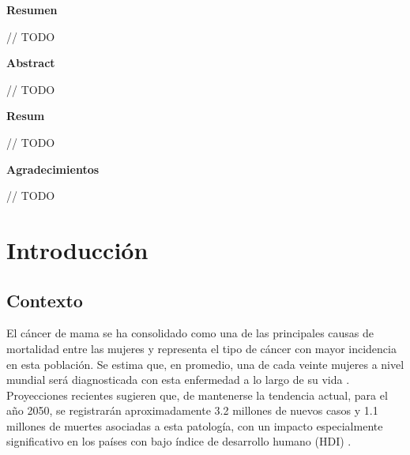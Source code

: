 \documentclass[a4paper,10pt]{book}
\begin{document}
\newpage
{}
\noindent \textbf{\large Resumen}

// TODO


\newpage
{}
\noindent \textbf{\large Abstract}

// TODO


\newpage
{}
\noindent \textbf{\large Resum}

// TODO

\newpage
{}
\noindent \textbf{\large Agradecimientos}

// TODO
 \setcounter{page}{0}
\let\cleardoublepage\clearpage
\tableofcontents
\newpage \thispagestyle{empty}


\pagestyle{fancy}
\newpage \thispagestyle{empty}
\mainmatter
\chapter{Introducción}
\section{Contexto}

El cáncer de mama se ha consolidado como una de las principales causas de mortalidad entre las mujeres y representa el tipo de cáncer con mayor incidencia en esta población. Se estima que, en promedio, una de cada veinte mujeres a nivel mundial será diagnosticada con esta enfermedad a lo largo de su vida \cite{kim_global_2025}. Proyecciones recientes sugieren que, de mantenerse la tendencia actual, para el año 2050, se registrarán aproximadamente 3.2 millones de nuevos casos y 1.1 millones de muertes asociadas a esta patología, con un impacto especialmente significativo en los países con bajo índice de desarrollo humano (HDI) \cite{kim_global_2025}.
\end{document}

